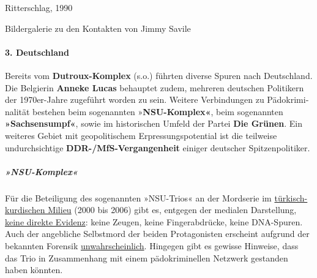 Ritterschlag, 1990

Bildergalerie zu den Kontakten von Jimmy Savile

\hypertarget{3-deutschland}{%
\paragraph{3. Deutschland}\label{3-deutschland}}

Bereits vom \textbf{Dutroux-Komplex} (s.o.) führten diverse Spuren nach
Deutschland. Die Belgierin \textbf{Anneke Lucas} behauptet zudem,
mehreren deutschen Politikern der 1970er-Jahre zugeführt worden zu sein.
Weitere Verbindungen zu Pädo­krimi­nalität bestehen beim sogenannten
»\textbf{NSU-Komplex«}, beim sogenannten \textbf{»Sachsen­sumpf«}, sowie
im historischen Umfeld der Partei \textbf{Die Grünen}. Ein weiteres
Gebiet mit geopolitischem Erpressungs­potential ist die teilweise
undurchsichtige \textbf{DDR-/MfS-Vergangenheit} einiger deutscher
Spitzenpolitiker.

\hypertarget{nsu-komplex}{%
\subparagraph{\texorpdfstring{\textbf{»NSU-Komplex«}}{»NSU-Komplex«}}\label{nsu-komplex}}

Für die Beteiligung des sogenannten »NSU-Trios« an der Mordserie im
\href{https://magazin.spiegel.de/EpubDelivery/spiegel/pdf/77108510}{türkisch-kurdischen
Milieu} (2000 bis 2006) gibt es, entgegen der medialen Darstellung,
\href{https://web.archive.org/web/20200404212742/https://olivernevermind.wordpress.com/2018/07/12/die-10-groessten-nsu-mythen/}{keine
direkte Evidenz}: keine Zeugen, keine Fingerabdrücke, keine DNA-Spuren.
Auch der angebliche Selbstmord der beiden Protagonisten erscheint
aufgrund der bekannten Forensik
\href{https://das-blaettchen.de/2017/04/nsu-wann-wie-und-wo-starben-mundlos-und-boehnhardt-39577.html}{unwahrscheinlich}.
Hingegen gibt es gewisse Hinweise, dass das Trio in Zusammenhang mit
einem pädokriminellen Netzwerk gestanden haben könnten.

